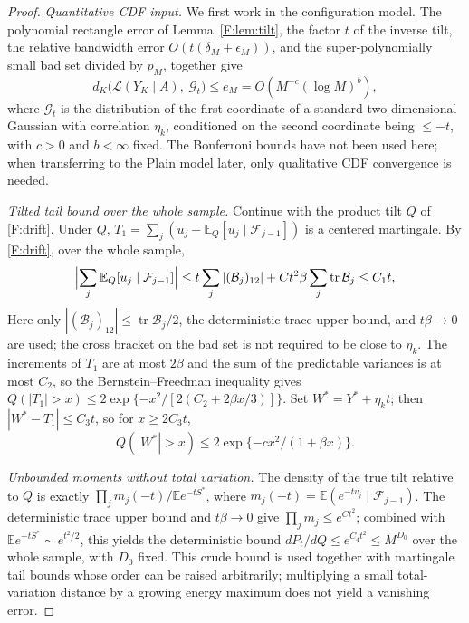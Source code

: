 \documentclass[a4paper,11pt]{article}
\numberwithin{equation}{section}
\newcommand{\E}{\mathbb E}
\begin{document}
\begin{proof}
\emph{Quantitative CDF input.} We first work in the configuration model. The polynomial rectangle error of
Lemma~\ref{F:lem:tilt}, the factor $t$ of the inverse tilt, the relative bandwidth error
$O(t(\delta_M+\epsilon_M))$, and the super-polynomially small bad set divided by $p_M$, together give
\begin{equation}
d_K\bigl(\mathcal L(Y_K\mid A),\ \mathcal G_t\bigr)\le e_M=O(M^{-c}(\log M)^b),\label{F:dK}
\end{equation}
where $\mathcal G_t$ is the distribution of the first coordinate of a standard two-dimensional Gaussian with
correlation $\eta_k$, conditioned on the second coordinate being $\le-t$, with $c>0$ and $b<\infty$ fixed. The
Bonferroni bounds have not been used here; when transferring to the Plain model later, only qualitative CDF
convergence is needed.

\emph{Tilted tail bound over the whole sample.} Continue with the product tilt $Q$ of \eqref{F:drift}. Under
$Q$, $T_1=\sum_j(u_j-\E_Q[u_j\mid\mathcal F_{j-1}])$ is a centered martingale. By \eqref{F:drift}, over the
whole sample,
\[
\Bigl|\sum_j\E_Q[u_j\mid\mathcal F_{j-1}]\Bigr|\le t\sum_j|(\mathcal B_j)_{12}|+Ct^2\beta\sum_j\operatorname{tr}\mathcal B_j\le C_1t,
\]
Here only $|(\mathcal B_j)_{12}|\le\operatorname{tr}\mathcal B_j/2$, the deterministic trace upper bound, and
$t\beta\to0$ are used; the cross bracket on the bad set is not required to be close to $\eta_k$. The increments
of $T_1$ are at most $2\beta$ and the sum of the predictable variances is at most $C_2$, so the
Bernstein--Freedman inequality gives $Q(|T_1|>x)\le2\exp\{-x^2/[2(C_2+2\beta x/3)]\}$. Set $W^*=Y^*+\eta_kt$;
then $|W^*-T_1|\le C_3t$, so for $x\ge2C_3t$,
\begin{equation}
Q(|W^*|>x)\le2\exp\{-cx^2/(1+\beta x)\}.\label{F:Qtail}
\end{equation}

\emph{Unbounded moments without total variation.} The density of the true tilt relative to $Q$ is exactly
$\prod_jm_j(-t)/\E e^{-tS^*}$, where $m_j(-t)=\E(e^{-tv_j}\mid\mathcal F_{j-1})$. The deterministic trace
upper bound and $t\beta\to0$ give $\prod_jm_j\le e^{Ct^2}$; combined with $\E e^{-tS^*}\sim e^{t^2/2}$, this
yields the deterministic bound $dP_t/dQ\le e^{C_4t^2}\le M^{D_0}$ over the whole sample, with $D_0$ fixed.
This crude bound is used together with martingale tail bounds whose order can be raised arbitrarily;
multiplying a small total-variation distance by a growing energy maximum does not yield a vanishing error.


\end{proof}
\end{document}
